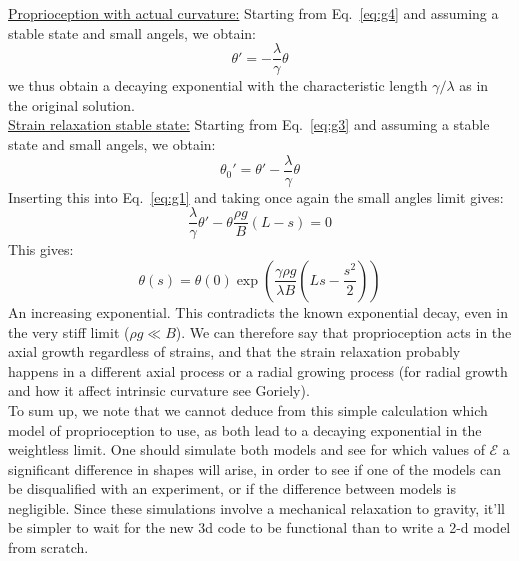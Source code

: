 \documentclass[a4paper, 11pt]{article}
\begin{document}
\noindent \underline{Proprioception with actual curvature:} Starting from Eq.~\ref{eq:g4} and assuming a stable state and small angels, we obtain:
\begin{equation}
    \theta'=-\frac{\lambda}{\gamma}\theta
\end{equation}
we thus obtain a decaying exponential with the characteristic length $\gamma/\lambda$ as in the original solution.\\

\noindent \underline{Strain relaxation stable state:} Starting from Eq.~\ref{eq:g3} and assuming a stable state and small angels, we obtain:
    \begin{equation}
        \theta_0'=\theta'-\frac{\lambda}{\gamma}\theta
    \end{equation}
    Inserting this into Eq.~\ref{eq:g1} and taking once again the small angles limit gives:
    \begin{equation}\label{eq:ODE1}
        \frac{\lambda}{\gamma}\theta'-\theta\frac{\rho g}{B} (L-s)=0
    \end{equation}
    This gives:
    \begin{equation}
        \theta(s)=\theta(0)\exp{\left(\frac{\gamma\rho g}{\lambda B}(Ls-\frac{s^2}{2})\right)}
    \end{equation}
An increasing exponential. This contradicts the known exponential decay, even in the very stiff limit ($\rho g \ll B$). We can therefore say that proprioception acts in the axial growth regardless of strains, and that the strain relaxation probably happens in a different axial process or a radial growing process (for radial growth and how it affect intrinsic curvature see Goriely).\\

\noindent To sum up, we note that we cannot deduce from this simple calculation which model of proprioception to use, as both lead to a decaying exponential in the weightless limit. One should simulate both models and see for which values of $\mathcal{E}$ a significant difference in shapes will arise, in order to see if one of the models can be disqualified with an experiment, or if the difference between models is negligible. Since these simulations involve a mechanical relaxation to gravity, it'll be simpler to wait for the new 3d code to be functional than to write a 2-d model from scratch.
\end{document}
